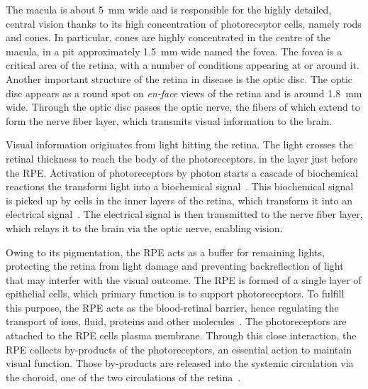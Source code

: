 \documentclass[12pt,a4paper]{journal}
\begin{document}
The macula is about \SI{5}{\mm} wide and is responsible for the highly detailed, central vision thanks to its high concentration of photoreceptor cells, namely rods and cones.
In particular, cones are highly concentrated in the centre of the macula, in a pit approximately \SI{1.5}{\mm} wide named the fovea.
The fovea is a critical area of the retina, with a number of conditions appearing at or around it.
\\
Another important structure of the retina in disease is the optic disc.
The optic disc appears as a round spot on \textit{en-face} views of the retina and is around \SI{1.8}{\mm} wide.
Through the optic disc passes the optic nerve, the fibers of which extend to form the nerve fiber layer, which transmits visual information to the brain.

Visual information originates from light hitting the retina.
The light crosses the retinal thickness to reach the body of the photoreceptors, in the layer just before the RPE.
Activation of photoreceptors by photon starts a cascade of biochemical reactions the transform light into a biochemical signal~\cite{Hurley_2009}.
This biochemical signal is picked up by cells in the inner layers of the retina, which transform it into an electrical signal~\cite{Arslan_2018}.
The electrical signal is then transmitted to the nerve fiber layer, which relays it to the brain via the optic nerve, enabling vision.

Owing to its pigmentation, the RPE acts as a buffer for remaining lights, protecting the retina from light damage and preventing backreflection of light that may interfer with the visual outcome.
The RPE is formed of a single layer of epithelial cells, which primary function is to support photoreceptors.
To fulfill this purpose, the RPE acts as the blood-retinal barrier, hence regulating the transport of ions, fluid, proteins and other molecules~\cite{Boulton_2001}.
The photoreceptors are attached to the RPE cells plasma membrane.
Through this close interaction, the RPE collects by-products of the photoreceptors, an essential action to maintain visual function.
Those by-products are released into the systemic circulation via the choroid, one of the two circulations of the retina~\cite{Boulton_2001}.
\end{document}
